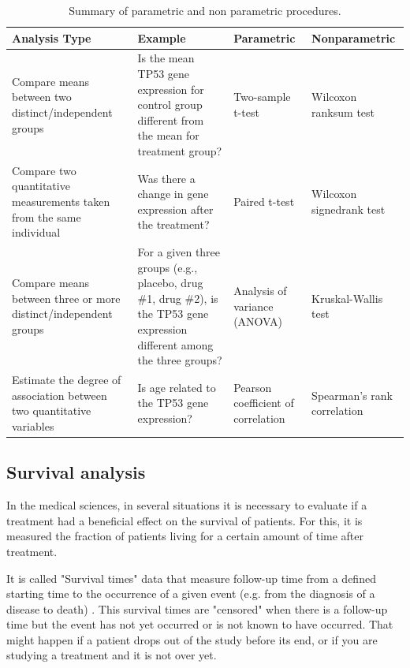 \bgroup
\def\arraystretch{2.0}%

\begin{table}[h!]
\footnotesize
\centering
\caption{Summary of parametric and non parametric procedures.}
\label{Parametric-nonparametric}
\begin{tabular}{p{3.5cm}p{4cm}p{3cm}p{3cm}}
\toprule
\textbf{Analysis Type} & \textbf{Example} & \textbf{Parametric} & \textbf{Nonparametric} \\ \midrule
Compare means between two distinct/independent groups & Is the mean TP53 gene expression for control group different from the mean for treatment group? & Two-sample t-test & Wilcoxon ranksum test \\
Compare two quantitative measurements taken from the same individual & Was there a change in gene expression after the treatment? & Paired t-test & Wilcoxon signedrank test \\
Compare means between three or more distinct/independent groups & For a given three groups (e.g., placebo, drug \#1, drug \#2), is the TP53 gene expression different among the three groups? & Analysis of variance (ANOVA) & Kruskal-Wallis test \\
Estimate the degree of association between two quantitative variables & Is age related to the TP53 gene expression? & Pearson coefficient of correlation & Spearman’s rank correlation \\ \bottomrule
\end{tabular}
\end{table}
\egroup



\subsection{Survival analysis}

In the medical sciences, in several situations it is necessary to evaluate if
a treatment had a beneficial effect on the survival of patients.
For this, it is measured the fraction of patients living for a certain amount of time after treatment.

It is called "Survival times" data that measure follow-up time from a
defined starting time to the occurrence of a given event
(e.g. from the diagnosis of a disease to death) \cite{bewick2004statistics}.
This survival times are "censored" when there is a follow-up time
but the event has not yet occurred or is not known to have occurred.
That might happen if a patient drops out of the study before its end,
or if you are studying a treatment and it is not over yet.

